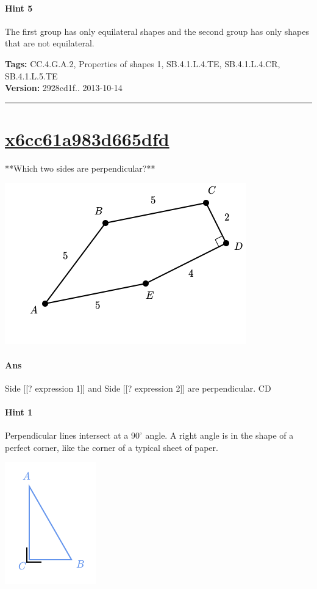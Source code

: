\documentclass[twocolumn,10pt]{article}
\def\shrinkfactor{0.55}
\begin{document}
\paragraph{Hint 5}The first group has only equilateral shapes and the second group has only shapes that are not equilateral.



\medskip
\noindent
\textbf{Tags:} {\footnotesize CC.4.G.A.2, Properties of shapes 1, SB.4.1.L.4.TE, SB.4.1.L.4.CR, SB.4.1.L.5.TE}\\
\textbf{Version:} 2928cd1f.. 2013-10-14
\smallskip\hrule





\section{\href{https://www.khanacademy.org/devadmin/content/items/x6cc61a983d665dfd}{x6cc61a983d665dfd}}

\noindent
**Which two sides are perpendicular?**


\includegraphics[scale=\shrinkfactor]{figures/e89694af7de05350f951069a187e20d95da00947.png}

\paragraph{Ans} Side  [[? expression 1]] and Side  [[? expression 2]] are perpendicular.  CD

\paragraph{Hint 1}Perpendicular lines intersect at a $90 ^\circ$ angle.  
A right angle is in the shape of a perfect corner, like the corner of a typical sheet of paper.


\includegraphics[scale=\shrinkfactor]{figures/497661f48f441186b5e021d8ca8c4f0c7449214f.png}
\end{document}
